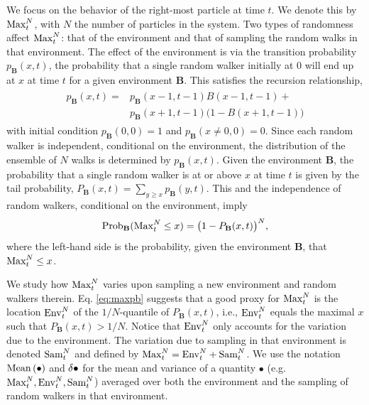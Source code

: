 We focus on the behavior of the right-most particle at time $t$. We denote this by $\mathrm{Max}^{N}_t$, with $N$ the number of particles in the system. Two types of randomness affect $\mathrm{Max}^{N}_t$: that of the environment and that of sampling the random walks in that environment. The effect of the environment is via the transition probability $p_{\mathbf{B}}(x,t)$, the probability that a single random walker initially at $0$ will end up at $x$ at time $t$ for a given environment $\mathbf{B}$. This satisfies the recursion relationship, %
%
\begin{align} \label{eq:kolmogorov}
 \begin{split}
  p_{\mathbf{B}}(x,t) = & p_{\mathbf{B}}(x-1,t-1)B(x-1,t-1) +\\
  & p_{\mathbf{B}}(x+1,t-1)\big(1-B(x+1,t-1)\big)
 \end{split}
\end{align}
%
with initial condition $p_{\mathbf{B}}(0,0) = 1$ and $p_{\mathbf{B}}(x \neq 0,0) = 0$. Since each random walker is independent, conditional on the environment, the distribution of the ensemble of $N$ walks is determined by $p_{\mathbf{B}}(x,t)$. Given the environment $\mathbf{B}$, the probability that a single random walker is at or above $x$ at time $t$ is given by the tail probability, $P_{\mathbf{B}}(x,t) = \sum_{y\geq x} p_{\mathbf{B}}(y,t)$. This and the independence of random walkers, conditional on the environment, imply
%
\begin{equation}\label{eq:maxpb}
\mathrm{Prob}_{\mathbf{B}}(\mathrm{Max}^{N}_t \leq x) = \big(1-P_{\mathbf{B}}(x,t)\big)^N,
\end{equation}
%
where the left-hand side is the probability, given the environment $\mathbf{B}$, that $\mathrm{Max}^{N}_t \leq x$.

We study how $\mathrm{Max}^{N}_t$ varies upon sampling a new environment and random walkers therein. Eq. \eqref{eq:maxpb} suggests that a good proxy for $\mathrm{Max}^{N}_t$ is the location $\mathrm{Env}^{N}_t$ of the $1/N$-quantile of $P_{\mathbf{B}}(x,t)$, i.e., $\mathrm{Env}^{N}_t$ equals the maximal $x$ such that $P_{\mathbf{B}}(x,t)>1/N$. Notice that $\mathrm{Env}^{N}_t$ only accounts for the variation due to the environment. The variation due to sampling in that environment is denoted $\mathrm{Sam}^{N}_t$ and defined by $\mathrm{Max}^{N}_t = \mathrm{Env}^{N}_t + \mathrm{Sam}^{N}_t$. We use the notation $\mathrm{Mean}\left(\bullet\right)$ and $\var{\bullet}$ for the mean and variance of a quantity $\bullet$ (e.g. $\mathrm{Max}^{N}_t, \mathrm{Env}^{N}_t,\mathrm{Sam}^{N}_t$) averaged over both the environment and the sampling of random walkers in that environment.

